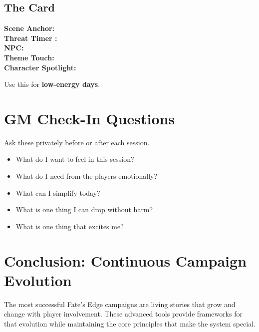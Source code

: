 \documentclass[11pt]{article}
\begin{document}
\subsection{The Card}

\begin{tcolorbox}[
  title=\textbf{One-Card Session},
  colback=gray!10,
  colframe=black,
  sharp corners,
  fonttitle=\bfseries
,breakable]
\textbf{Scene Anchor:} \underline{\phantom{XXXXXXXXXXXX}} \\
\textbf{Threat Timer :} \underline{\phantom{XXXXXXXXXXXX}} \\
\textbf{NPC:} \underline{\phantom{XXXXXXXXXXXX}} \\
\textbf{Theme Touch:} \underline{\phantom{XXXXXXXXXXXX}} \\
\textbf{Character Spotlight:} \underline{\phantom{XXXXXXXXXX}} \\
\end{tcolorbox}

Use this for \textbf{low-energy days}.


\section{GM Check-In Questions}
\label{appendix:gm-checkin}

Ask these privately before or after each session.

\begin{itemize}
    \item What do I want to feel in this session?
    \item What do I need from the players emotionally?
    \item What can I simplify today?
    \item What is one thing I can drop without harm?
    \item What is one thing that excites me?
\end{itemize}

\section{Conclusion: Continuous Campaign Evolution}

The most successful Fate's Edge campaigns are living stories that grow and change with player involvement. These advanced tools provide frameworks for that evolution while maintaining the core principles that make the system special.
\end{document}
